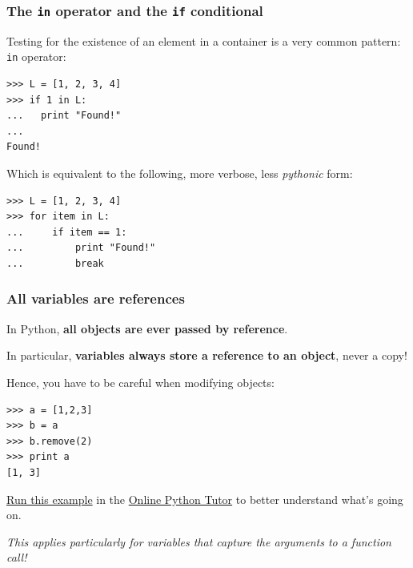 \documentclass[english,serif,mathserif,xcolor=pdftex,dvipsnames,table]{beamer}
\begin{document}
\begin{frame}
  \frametitle{The \texttt{in} operator and the \texttt{if} conditional
  }

  Testing for the existence of an element in a container is a very
  common pattern:
  \texttt{in} operator:

\begin{lstlisting}
>>> L = [1, 2, 3, 4]
>>> if 1 in L:
...   print "Found!"
...
Found!
\end{lstlisting}

\+ Which is equivalent to the following, more verbose, less
\textit{pythonic} form:
\begin{lstlisting}
>>> L = [1, 2, 3, 4]
>>> for item in L:
...     if item == 1:
...         print "Found!"
...         break
\end{lstlisting}
\end{frame}






\begin{frame}[fragile]
  \frametitle{All variables are references}

  In Python, \textbf{all objects are ever passed by reference}.

  \+
  In particular, \textbf{variables always store a reference to an
    object}, never a copy!

  \+
  Hence, you have to be careful when modifying objects:
\begin{lstlisting}
>>> a = [1,2,3]
>>> b = a
>>> b.remove(2)
>>> print a
[1, 3]
\end{lstlisting}

   \+
   \href{http://tinyurl.com/cq3tcab}{Run this example} in the
   \href{http://pythontutor.com/}{Online Python Tutor} to better
   understand what's going on.

   \+
   {\small \em
     This applies particularly for variables that capture the arguments
     to a function call!}

\end{frame}
\end{document}
